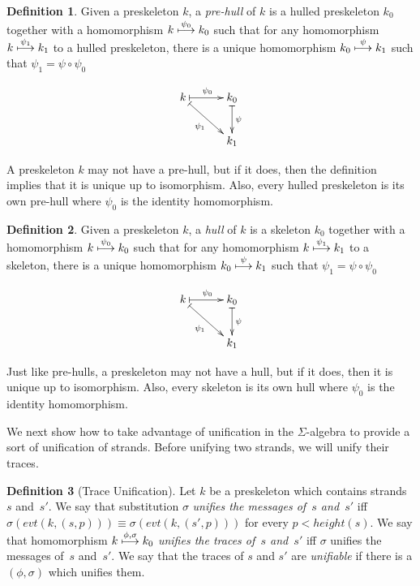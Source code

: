 \documentclass[12pt]{article}
\theoremstyle{definition}
\newtheorem{defn}{Definition}[section]
\begin{document}
\begin{defn}
Given a preskeleton $k$, a \emph{pre-hull} of $k$ is a hulled preskeleton
$k_0$ together with a homomorphism $k\stackrel{\psi_0}{\longmapsto}k_0$ such that
for any homomorphism $k\stackrel{\psi_1}{\longmapsto}k_1$ to a hulled preskeleton,
there is a unique homomorphism $k_0\stackrel{\psi}{\longmapsto}k_1$ such that
$\psi_1=\psi\circ\psi_0$

$$\xymatrix@C=3em{
k\ar@{|->}[r]^{\psi_0} \ar@{|->}[rd]_{\psi_1} &
k_0 \ar@{|->}[d]^{\psi}\\
&k_1}$$
\end{defn}

A preskeleton $k$ may not have a pre-hull, but if it does, then the definition
implies that it is unique up to isomorphism.  Also, every hulled preskeleton
is its own pre-hull where $\psi_0$ is the identity homomorphism.

\begin{defn}
Given a preskeleton $k$, a \emph{hull} of $k$ is a skeleton
$k_0$ together with a homomorphism $k\stackrel{\psi_0}{\longmapsto}k_0$ such that
for any homomorphism $k\stackrel{\psi_1}{\longmapsto}k_1$ to a skeleton,
there is a unique homomorphism $k_0\stackrel{\psi}{\longmapsto}k_1$ such that
$\psi_1=\psi\circ\psi_0$

$$\xymatrix@C=3em{
k\ar@{|->}[r]^{\psi_0} \ar@{|->}[rd]_{\psi_1} &
k_0 \ar@{|->}[d]^{\psi}\\
&k_1}$$
\end{defn}

Just like pre-hulls, a preskeleton may not have a hull, but if it does, then
it is unique up to isomorphism.  Also, every skeleton is its own hull
where $\psi_0$ is the identity homomorphism.

We next show how to take advantage of unification in the
$\Sigma$-algebra to provide a sort of unification of strands.  Before unifying
two strands, we will unify their traces.

\begin{defn}[Trace Unification]\label{def:trace-unification}
Let $k$ be a preskeleton which contains strands~$s$ and~$s'$.  We
say that substitution $\sigma$ \emph{unifies the messages of~$s$
and~$s'$} iff $\sigma(evt(k,(s,p))) \equiv \sigma(evt(k,(s',p)))$
for every $p < height(s)$.  We say that homomorphism
$k\stackrel{\phi,\sigma}{\longmapsto}k_0$ \emph{unifies the traces of~$s$
and~$s'$} iff $\sigma$ unifies the messages of~$s$ and~$s'$.
We say that the traces of $s$ and $s'$ are
\emph{unifiable} if there is a $(\phi,\sigma)$ which unifies them.
\end{defn}
\end{document}
